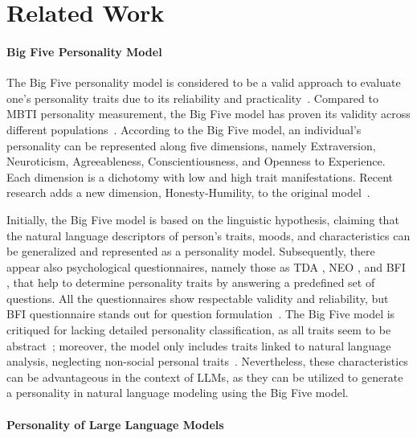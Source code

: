 \section{Related Work}
\paragraph{Big Five Personality Model} 

The Big Five personality model is considered to be a valid approach to evaluate one's personality traits due to its reliability and practicality~\cite{john2008paradigm}. Compared to MBTI personality measurement, the Big Five model has proven its validity across different populations~\cite{schweiger1985measuring}. According to the Big Five model, an individual's personality can be represented along five dimensions, namely Extraversion, Neuroticism, Agreeableness, Conscientiousness, and Openness to Experience. Each dimension is a dichotomy with low and high trait manifestations. Recent research adds a new dimension, Honesty-Humility, to the original model~\cite{costa2008revised}.

Initially, the Big Five model is based on the linguistic hypothesis, claiming that the natural language descriptors of person's traits, moods, and characteristics can be generalized and represented as a personality model. Subsequently, there appear also psychological questionnaires, namely those as TDA \cite{goldberg1992development}, NEO \cite{costa1978objective}, and BFI \cite{john1991big}, that help to determine personality traits by answering a predefined set of questions. All the questionnaires show respectable validity and reliability, but BFI questionnaire stands out for question formulation~\cite{john2008paradigm}. The Big Five model is critiqued for lacking detailed personality classification, as all traits seem to be abstract~\cite{john2008paradigm}; moreover, the model only includes traits linked to natural language analysis, neglecting non-social personal traits~\cite{trofimova2014observer}. Nevertheless, these characteristics can be advantageous in the context of LLMs, as they can be utilized to generate a personality in natural language modeling using the Big Five model.


\paragraph{Personality of Large Language Models}

